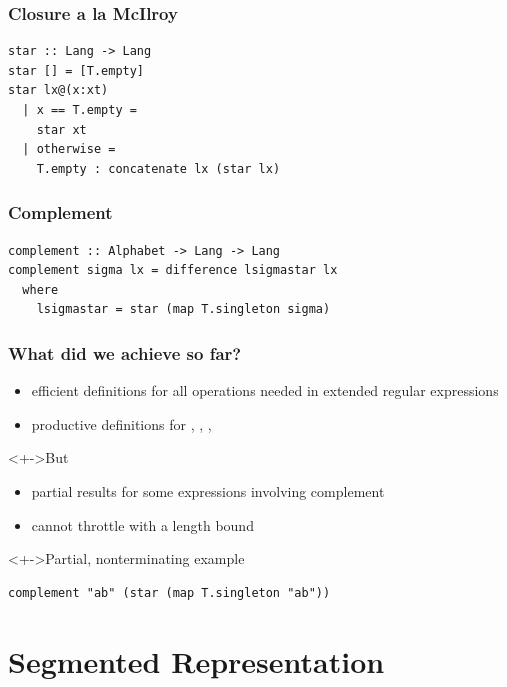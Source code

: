 \documentclass[pdftex,aspectratio=169]{beamer}
\begin{document}
\begin{frame}
  \frametitle{Closure a la McIlroy }
\begin{lstlisting}[numbers=none]
star :: Lang -> Lang
star [] = [T.empty]
star lx@(x:xt)
  | x == T.empty =
    star xt
  | otherwise =
    T.empty : concatenate lx (star lx)
\end{lstlisting}
\end{frame}

\begin{frame}[fragile]
  \frametitle{Complement}
\begin{lstlisting}[numbers=none]
complement :: Alphabet -> Lang -> Lang
complement sigma lx = difference lsigmastar lx
  where
    lsigmastar = star (map T.singleton sigma)
\end{lstlisting}
\end{frame}

\begin{frame}[fragile]
  \frametitle{What did we achieve so far?}
  \begin{itemize}
  \item<+-> efficient definitions for all operations needed in extended regular expressions
  \item<+-> productive definitions for ,
    , , 
  \end{itemize}
  \begin{block}<+->{But}
    \begin{itemize}
    \item partial results for some expressions involving complement
    \item cannot throttle with a length bound
  \end{itemize}
  \end{block}
  \begin{exampleblock}<+->{Partial, nonterminating example}
\begin{lstlisting}[numbers=none]
complement "ab" (star (map T.singleton "ab"))
\end{lstlisting}
  \end{exampleblock}
\end{frame}

\section{Segmented Representation}
\end{document}
